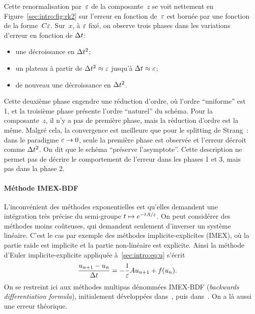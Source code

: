 Cette renormalisation par~$\varepsilon$ de la composante~$z$ se voit nettement en Figure~\ref{sec:intro:fig:rk2} sur l'erreur en fonction de~$\varepsilon$ est bornée par une fonction de la forme~$C\varepsilon$. Sur~$x$, à $\varepsilon$ fixé, on observe trois phases dans les variations d'erreur en fonction de $\Delta t$:
\begin{itemize}
    \item une décroissance en $\Delta t^2$;
    \item un plateau à partir de $\Delta t^2 \approx \varepsilon$ jusqu'à $\Delta t \approx \varepsilon$;
    \item de nouveau une décroissance en $\Delta t^2$.
\end{itemize}
Cette deuxième phase engendre une réduction d'ordre, où l'ordre \enquote{uniforme} est 1, et la troisième phase présente l'ordre \enquote{naturel} du schéma. Pour la composante~$z$, il n'y a pas de première phase, mais la réduction d'ordre est la même. Malgré cela, la convergence est meilleure que pour le splitting de Strang~: dans le paradigme $\varepsilon \rightarrow 0$, seule la première phase est observée et l'erreur décroit comme $\Delta t^2$. On dit que le schéma \enquote{préserve l'asymptote}. Cette description ne permet pas de décrire le comportement de l'erreur dans les phases 1 et 3, mais pas dans la phase 2. 




\paragraph{Méthode IMEX-BDF\\}


L'inconvénient des méthodes exponentielles est qu'elles demandent une intégration très précise du semi-groupe $t \mapsto e^{-tA/\varepsilon}$. On peut considérer des méthodes moins coûteuses, qui demandent seulement d'inverser un système linéaire. C'est le cas par exemple des méthodes implicite-explicites (IMEX), où la partie raide est implicite et la partie non-linéaire est explicite. Ainsi la méthode d'Euler implicite-explicite appliquée à~\eqref{sec:intro:eq:u} s'écrit
\begin{equation*}
    \frac{u_{n+1} - u_n}{\Delta t} = -\frac{1}{\varepsilon}A u_{n+1} + f(u_n) .
\end{equation*}
On se restreint ici aux méthodes multipas dénommées IMEX-BDF (\textit{backwards differentiation formula}), initialement développées dans~\cite{crouzeix.1980.methode}, puis dans~\cite{ascher.1995.implicit,akrivis.1999.implicit,hundsdorfer.2007.imex,dimarco.2017.implicit}. On a là aussi une erreur théorique.

